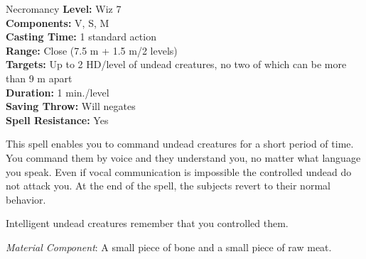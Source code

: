 {Necromancy}
{
	\textbf{Level:}
	Wiz 7\\
	\textbf{Components:}
	V, S, M\\
	\textbf{Casting Time:}
	1 standard action\\
	\textbf{Range:}
	Close (7.5 m + 1.5 m/2 levels)\\
	\textbf{Targets:}
	Up to 2 HD/level of undead creatures, no two of which can be more than 9 m apart\\
	\textbf{Duration:}
	1 min./level\\
	\textbf{Saving Throw:}
	Will negates\\
	\textbf{Spell Resistance:}
	Yes\\
}
{
	This spell enables you to command undead creatures for a short period of time. You command them by voice and they understand you, no matter what language you speak. Even if vocal communication is impossible the controlled undead do not attack you. At the end of the spell, the subjects revert to their normal behavior.

	Intelligent undead creatures remember that you controlled them.

	\textit{Material Component}:
	A small piece of bone and a small piece of raw meat.

}
